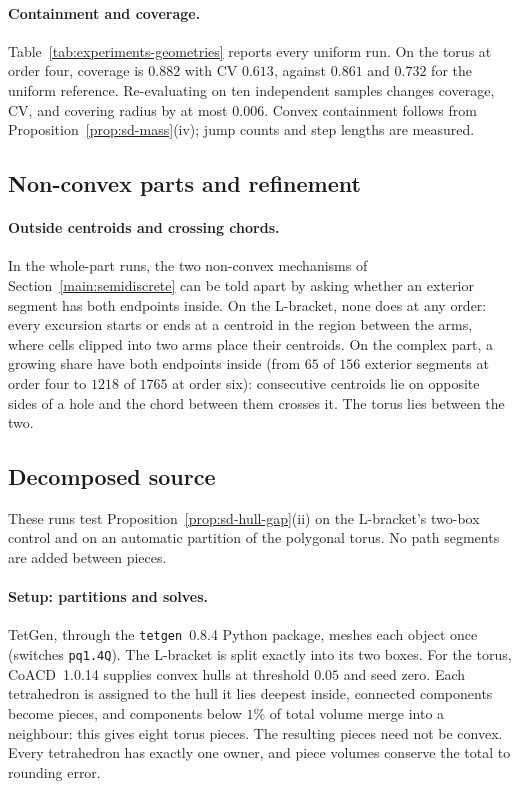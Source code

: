 \paragraph{Containment and coverage.}
Table~\ref{tab:experiments-geometries} reports every uniform run. On the torus at order four, coverage is $0.882$ with CV $0.613$, against $0.861$ and $0.732$ for the uniform reference. Re-evaluating on ten independent samples changes coverage, CV, and covering radius by at most $0.006$. Convex containment follows from Proposition~\ref{prop:sd-mass}(iv); jump counts and step lengths are measured.



\subsection{Non-convex parts and refinement}
\label{sec:experiments-resolution}
\label{sec:sd-nonconvex}

\paragraph{Outside centroids and crossing chords.}
In the whole-part runs, the two non-convex mechanisms of Section~\ref{main:semidiscrete} can be told apart by asking whether an exterior segment has both endpoints inside. On the L-bracket, none does at any order: every excursion starts or ends at a centroid in the region between the arms, where cells clipped into two arms place their centroids. On the complex part, a growing share have both endpoints inside (from $65$ of $156$ exterior segments at order four to $1218$ of $1765$ at order six): consecutive centroids lie on opposite sides of a hole and the chord between them crosses it. The torus lies between the two.

\subsection{Decomposed source}
\label{sec:experiments-pieces-independent}

These runs test Proposition~\ref{prop:sd-hull-gap}(ii) on the L-bracket's two-box control and on an automatic partition of the polygonal torus. No path segments are added between pieces.

\paragraph{Setup: partitions and solves.}
TetGen, through the \texttt{tetgen}~0.8.4 Python package, meshes each object once (switches \texttt{pq1.4Q}). The L-bracket is split exactly into its two boxes. For the torus, CoACD~1.0.14 \cite{wei2022coacd} supplies convex hulls at threshold $0.05$ and seed zero. Each tetrahedron is assigned to the hull it lies deepest inside, connected components become pieces, and components below $1\%$ of total volume merge into a neighbour: this gives eight torus pieces. The resulting pieces need not be convex. Every tetrahedron has exactly one owner, and piece volumes conserve the total to rounding error.

